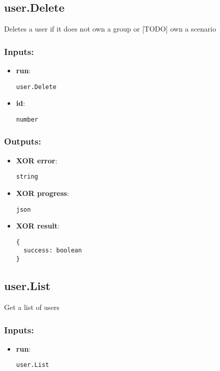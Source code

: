 \subsection{user.Delete}
\label{ch:builtinservices:user.Delete}
Deletes a user if it does not own a group or [TODO] own a scenario
\subsubsection*{Inputs:}
\begin{itemize}
  \small
    \item \textbf{run}: 
\begin{lstlisting}
user.Delete
\end{lstlisting}
    \item \textbf{id}: 
\begin{lstlisting}
number
\end{lstlisting}
  \end{itemize}
\subsubsection*{Outputs:}
\begin{itemize}
  \small
    \item \textbf{XOR error}: 
\begin{lstlisting}
string
\end{lstlisting}
    \item \textbf{XOR progress}: 
\begin{lstlisting}
json
\end{lstlisting}
    \item \textbf{XOR result}: 
\begin{lstlisting}
{
  success: boolean
}
\end{lstlisting}
  \end{itemize}

\subsection{user.List}
\label{ch:builtinservices:user.List}
Get a list of users
\subsubsection*{Inputs:}
\begin{itemize}
  \small
    \item \textbf{run}: 
\begin{lstlisting}
user.List
\end{lstlisting}
  \end{itemize}

